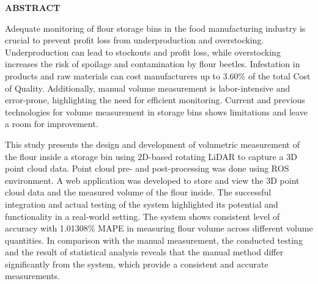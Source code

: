 \begin{center}
	\noindent \textbf{ABSTRACT}
\end{center}


Adequate monitoring of flour storage bins in the food manufacturing industry is crucial to prevent profit loss from underproduction and overstocking. Underproduction can lead to stockouts and profit loss, while overstocking increases the risk of spoilage and contamination by flour beetles. Infestation in products and raw materials can cost manufacturers up to 3.60\% of the total Cost of Quality. Additionally, manual volume measurement is labor-intensive and error-prone, highlighting the need for efficient monitoring. Current and previous technologies for volume measurement in storage bins shows limitations and leave a room for improvement.

This study presents the design and development of volumetric measurement of the flour inside a storage bin using 2D-based rotating LiDAR to capture a 3D point cloud data. Point cloud pre- and post-processing was done using ROS environment. A web application was developed to store and view the 3D point cloud data and the measured volume of the flour inside. The successful integration and actual testing of the system highlighted its potential and functionality in a real-world setting. The system shows consistent level of accuracy with 1.01308\% MAPE in measuring flour volume across different volume quantities. In comparison with the manual measurement, the conducted testing and the result of statistical analysis reveals that the manual method differ significantly from the system, which provide a consistent and accurate measurements.

